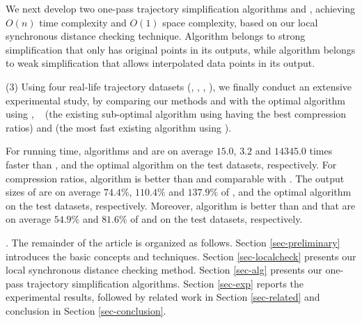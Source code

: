 
 We next develop two one-pass trajectory simplification algorithms \cist and \cista, achieving $O(n)$ time complexity and $O(1)$ space complexity, based on our local synchronous distance checking technique.
Algorithm \cist belongs to strong simplification that only has original points in its outputs, while algorithm \cista belongs to weak simplification that allows interpolated data points in its output.


\sstab (3) Using four real-life trajectory datasets (\truck, \sercar, \geolife, \pricar),
we finally conduct an extensive experimental study, by comparing our methods \cist and \cista  with the optimal \lsa algorithm using \sed, \dps~\cite{Meratnia:Spatiotemporal} (the existing sub-optimal \lsa algorithm using \sed having the best compression ratios) and \squishe \cite{Muckell:Compression} (the most fast existing \lsa algorithm using \sed).

For running time,
algorithms \cist and \cista are on average $15.0$, $3.2$ and $14345.0$ times faster than \dps, \squishe and the optimal \lsa algorithm on the test datasets, respectively.
%
For compression ratios, algorithm \cist is better than \squishe and comparable with \dps. The output sizes of \cist are on average $74.4\%$, $110.4\%$ and $137.9\%$ of \squishe, \dps and the optimal \lsa algorithm on the test datasets, respectively.
Moreover, algorithm \cista is better than \squishe and \dps that are on average $54.9\%$ and $81.6\%$ of \squishe and \dps on the test datasets, respectively.


.
The remainder of the article is organized as follows.
Section \ref{sec-preliminary} introduces the basic concepts and techniques.
Section \ref{sec-localcheck} presents our local synchronous distance checking method.
Section \ref{sec-alg} presents our one-pass trajectory simplification algorithms.
Section \ref{sec-exp} reports the experimental results, followed by related work in
Section \ref{sec-related} and conclusion in Section \ref{sec-conclusion}.





